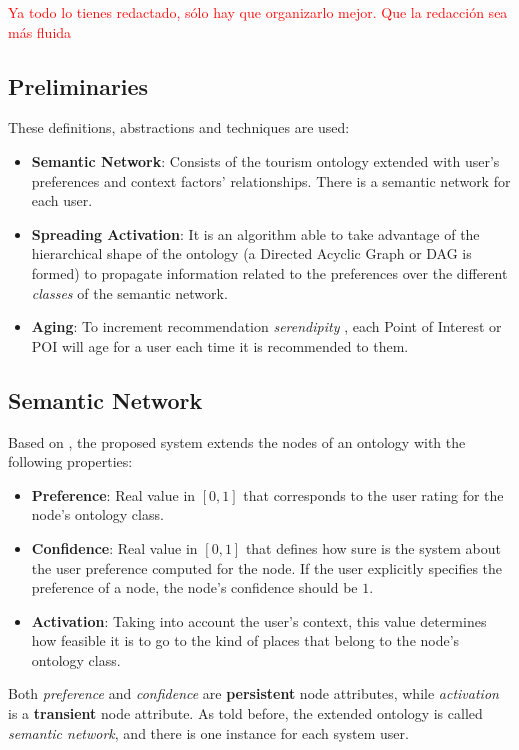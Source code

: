\textcolor{red}{Ya todo lo tienes redactado, sólo hay que organizarlo mejor. Que la redacción sea más fluida}

\subsection{Preliminaries}
These definitions, abstractions and techniques are used:
\begin{itemize}
\item \textbf{Semantic Network}: Consists of the tourism ontology extended with user's preferences and context factors' relationships. There is a semantic network for each user.
\item \textbf{Spreading Activation}: It is an algorithm able to take advantage of the hierarchical shape of the ontology (a Directed Acyclic Graph or DAG is formed) to propagate information related to the preferences over the different \textit{classes} of the semantic network.
\item \textbf{Aging}: To increment recommendation \textit{serendipity} \cite{kotkov2016survey}, each Point of Interest or POI will age for a user each time it is recommended to them.
\end{itemize}

\subsection{Semantic Network} \label{section:semantic_network}

Based on \cite{bahramian_abbaspour_claramunt_2017}, the proposed system extends the nodes of an ontology with the following properties:
\begin{itemize}
    \item \textbf{Preference}: Real value in $[0, 1]$ that corresponds to the user rating for the node's ontology class.
    \item \textbf{Confidence}: Real value in $[0, 1]$ that defines how sure is the system about the user preference computed for the node. If the user explicitly specifies the preference of a node, the node's confidence should be $1$.
    \item \textbf{Activation}: Taking into account the user's context, this value determines how feasible it is to go to the kind of places that belong to the node's ontology class.
\end{itemize}{}
Both \textit{preference} and \textit{confidence} are \textbf{persistent} node attributes, while \textit{activation} is a \textbf{transient} node attribute. As told before, the extended ontology is called \textit{semantic network}, and there is one instance for each system user.
 
